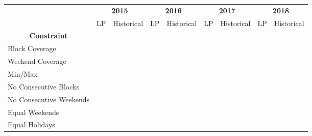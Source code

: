 \begin{table}[htbp]
	\centering
	\begin{tabular}{l|cc|cc|cc|cc}
		\multirow{2}[1]{*}{}                                & \multicolumn{2}{c|}{\textbf{2015}} & \multicolumn{2}{c|}{\textbf{2016}} & \multicolumn{2}{c|}{\textbf{2017}} & \multicolumn{2}{c}{\textbf{2018}} \\
		                                                    &     LP     &      Historical       &     LP     &      Historical       &     LP     &      Historical       &     LP     &      Historical      \\ \midrule
		\multicolumn{1}{c|}{\textbf{Constraint}}            &            &                       &            &                       &            &                       &            &                      \\ \midrule
		Block Coverage                                      & \checkmark &      \checkmark       & \checkmark &      \checkmark       & \checkmark &      \checkmark       & \checkmark &      \checkmark      \\
		Weekend Coverage                                    & \checkmark &      \checkmark       & \checkmark &      \checkmark       & \checkmark &      \checkmark       & \checkmark &      \checkmark      \\
		Min/Max                                             & \checkmark &      \checkmark       & \checkmark &      \checkmark       & \checkmark &      \checkmark       & \checkmark &      \checkmark      \\
		No Consecutive Blocks                               & \checkmark &                       & \checkmark &                       & \checkmark &                       & \checkmark &                      \\
		No Consecutive Weekends                             & \checkmark &                       & \checkmark &                       & \checkmark &      \checkmark       & \checkmark &      \checkmark      \\
		Equal Weekends                                      & \checkmark &                       & \checkmark &                       & \checkmark &                       & \checkmark &                      \\
		Equal Holidays                                      & \checkmark &                       & \checkmark &      \checkmark       & \checkmark &                       & \checkmark &      \checkmark      \\ \midrule

\end{tabular}
\end{table}
